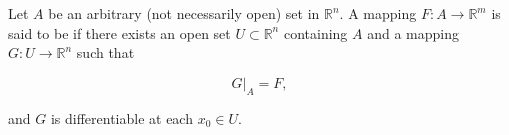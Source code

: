 Let $A$ be an arbitrary (not necessarily open) set in $\mathbb{R}^n$. A mapping $F: A \to \mathbb{R}^m$ is said to be  if there exists an open set $U \subset \mathbb{R}^n$ containing $A$ and a mapping $G: U \to \mathbb{R}^n$ such that

$$G|_A = F,$$

and $G$ is differentiable at each $x_0 \in U$.

